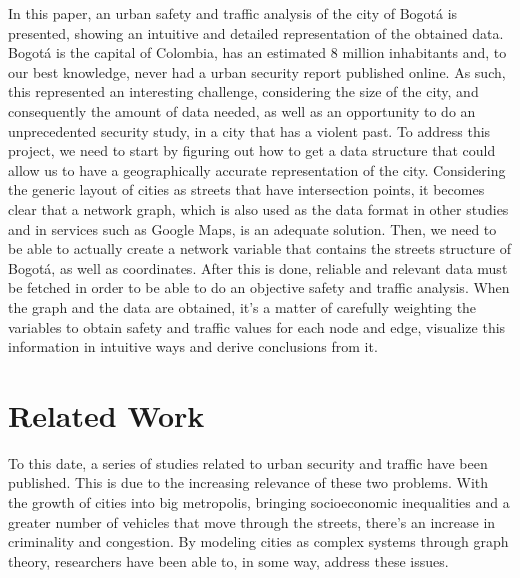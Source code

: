 \documentclass[runningheads]{llncs}
\begin{document}
In this paper, an urban safety and traffic analysis of the city of Bogotá is presented, showing an intuitive and detailed representation of the obtained data. Bogotá is the capital of Colombia, has an estimated 8 million inhabitants and, to our best knowledge, never had a urban security report published online. As such, this represented an interesting challenge, considering the size of the city, and consequently the amount of data needed, as well as an opportunity to do an unprecedented security study, in a city that has a violent past. To address this project, we need to start by figuring out how to get a data structure that could allow us to have a geographically accurate representation of the city. Considering the generic layout of cities as streets that have intersection points, it becomes clear that a network graph, which is also used as the data format in other studies \cite{geoff_osmnx:_2017} \cite{spadon_complex_2016} and in services such as Google Maps, is an adequate solution. Then, we need to be able to actually create a network variable that contains the streets structure of Bogotá, as well as coordinates. After this is done, reliable and relevant data must be fetched in order to be able to do an objective safety and traffic analysis. When the graph and the data are obtained, it's a matter of carefully weighting the variables to obtain safety and traffic values for each node and edge, visualize this information in intuitive ways and derive conclusions from it.


\section{Related Work}

To this date, a series of studies related to urban security and traffic have been published. This is due to the increasing relevance of these two problems. With the growth of cities into big metropolis, bringing socioeconomic inequalities and a greater number of vehicles that move through the streets, there's an increase in criminality and congestion. By modeling cities as complex systems through graph theory, researchers have been able to, in some way, address these issues.
\end{document}
